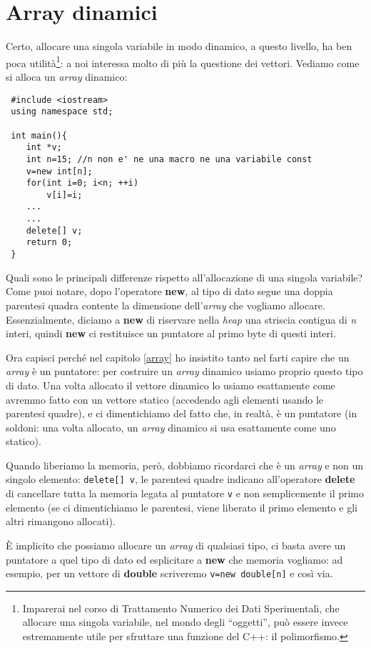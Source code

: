  \section{Array dinamici}
 Certo, allocare una singola variabile in modo dinamico, a questo livello, ha ben poca utilità\footnote{Imparerai nel corso di Trattamento Numerico dei Dati Sperimentali, che allocare una singola variabile, nel mondo degli ``oggetti'', può essere invece estremamente utile per sfruttare una funzione del C++: il polimorfismo.}: a noi interessa molto di più la questione dei vettori. Vediamo come si alloca un \emph{array} dinamico:
 
 \begin{lstlisting}
 #include <iostream>
 using namespace std;
 
 int main(){
 	int *v;
 	int n=15; //n non e' ne una macro ne una variabile const
 	v=new int[n];
 	for(int i=0; i<n; ++i)
 		v[i]=i;
 	...
 	...
 	delete[] v;
 	return 0;
 }
 \end{lstlisting}
 
 Quali sono le principali differenze rispetto all'allocazione di una singola variabile? Come puoi notare, dopo l'operatore \textbf{new}, al tipo di dato segue una doppia parentesi quadra contente la dimensione dell'\emph{array} che vogliamo allocare. Essenzialmente, diciamo a \textbf{new} di riservare nella \emph{heap} una striscia contigua di \emph{n} interi, quindi \textbf{new} ci restituisce un puntatore al primo byte di questi interi. 
 
 
Ora capisci perché nel capitolo \ref{array} ho insistito tanto nel farti capire che un \emph{array} è un puntatore: per costruire un \emph{array} dinamico usiamo proprio questo tipo di dato. Una volta allocato il vettore dinamico lo usiamo esattamente come avremmo fatto con un vettore statico (accedendo agli elementi usando le parentesi quadre), e ci dimentichiamo del fatto che, in realtà, è un puntatore (in soldoni: una volta allocato, un \emph{array} dinamico si usa esattamente come uno statico). 

Quando liberiamo la memoria, però, dobbiamo ricordarci che è un \emph{array} e non un singolo elemento: \lstinline|delete[] v|, le parentesi quadre indicano all'operatore \textbf{delete} di cancellare tutta la memoria legata al puntatore \verb|v| e non semplicemente il primo elemento (se ci dimentichiamo le parentesi, viene liberato il primo elemento e gli altri rimangono allocati). 

È implicito che possiamo allocare un \emph{array} di qualsiasi tipo, ci basta avere un puntatore a quel tipo di dato ed esplicitare a \textbf{new} che memoria vogliamo: ad esempio, per un vettore di \textbf{double} scriveremo \lstinline|v=new double[n]| e così via.

